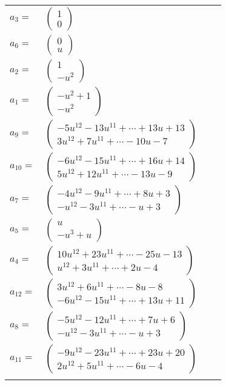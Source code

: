 \documentclass[1p]{elsarticle_modified}
\theoremstyle{definition}
\begin{document}
\begin{tabular}{m{7pt} m{180pt} m{7pt} m{180pt} }
\flushright $a_{3}=$&$\begin{pmatrix}1\\0\end{pmatrix}$ \\
\flushright $a_{6}=$&$\begin{pmatrix}0\\u\end{pmatrix}$ \\
\flushright $a_{2}=$&$\begin{pmatrix}1\\- u^2\end{pmatrix}$ \\
\flushright $a_{1}=$&$\begin{pmatrix}- u^2+1\\- u^2\end{pmatrix}$ \\
\flushright $a_{9}=$&$\begin{pmatrix}-5 u^{12}-13 u^{11}+\cdots+13 u+13\\3 u^{12}+7 u^{11}+\cdots-10 u-7\end{pmatrix}$ \\
\flushright $a_{10}=$&$\begin{pmatrix}-6 u^{12}-15 u^{11}+\cdots+16 u+14\\5 u^{12}+12 u^{11}+\cdots-13 u-9\end{pmatrix}$ \\
\flushright $a_{7}=$&$\begin{pmatrix}-4 u^{12}-9 u^{11}+\cdots+8 u+3\\- u^{12}-3 u^{11}+\cdots- u+3\end{pmatrix}$ \\
\flushright $a_{5}=$&$\begin{pmatrix}u\\- u^3+u\end{pmatrix}$ \\
\flushright $a_{4}=$&$\begin{pmatrix}10 u^{12}+23 u^{11}+\cdots-25 u-13\\u^{12}+3 u^{11}+\cdots+2 u-4\end{pmatrix}$ \\
\flushright $a_{12}=$&$\begin{pmatrix}3 u^{12}+6 u^{11}+\cdots-8 u-8\\-6 u^{12}-15 u^{11}+\cdots+13 u+11\end{pmatrix}$ \\
\flushright $a_{8}=$&$\begin{pmatrix}-5 u^{12}-12 u^{11}+\cdots+7 u+6\\- u^{12}-3 u^{11}+\cdots- u+3\end{pmatrix}$ \\
\flushright $a_{11}=$&$\begin{pmatrix}-9 u^{12}-23 u^{11}+\cdots+23 u+20\\2 u^{12}+5 u^{11}+\cdots-6 u-4\end{pmatrix}$\\&\end{tabular}
\end{document}
